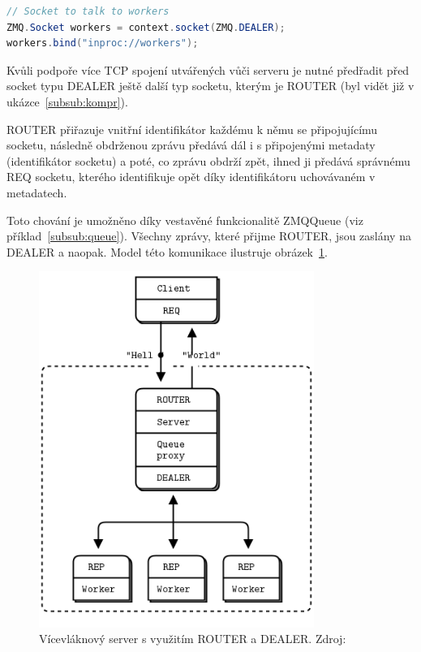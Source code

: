 \documentclass[thesis=M,czech]{FITthesis}[2014/05/07]
\begin{document}
\begin{lstlisting}[language=java]
// Socket to talk to workers
ZMQ.Socket workers = context.socket(ZMQ.DEALER);
workers.bind("inproc://workers");
\end{lstlisting}

Kvůli podpoře více TCP spojení utvářených vůči serveru je nutné předřadit před socket typu DEALER ještě další typ socketu, kterým je ROUTER (byl vidět již v ukázce~\ref{subsub:kompr}). 

ROUTER přiřazuje vnitřní identifikátor každému k němu se připojujícímu socketu, následně obdrženou zprávu předává dál i s připojenými metadaty (identifikátor socketu) a poté, co zprávu obdrží zpět, ihned ji předává správnému REQ socketu, kterého identifikuje opět díky identifikátoru uchovávaném v metadatech.

Toto chování je umožněno díky vestavěné funkcionalitě ZMQQueue (viz příklad~\ref{subsub:queue}). Všechny zprávy, které přijme ROUTER, jsou zaslány na DEALER a naopak. Model této komunikace ilustruje obrázek~\ref{fig:mtserver}.

\begin{figure}\centering
	\includegraphics[width=0.8\textwidth]{obr/multithreadingServer.png}
 	\caption[Vícevláknový server s využitím ROUTER a DEALER.]{Vícevláknový server s využitím ROUTER a DEALER. Zdroj: \cite{mtserver}}\label{fig:mtserver}
\end{figure}	
\end{document}
